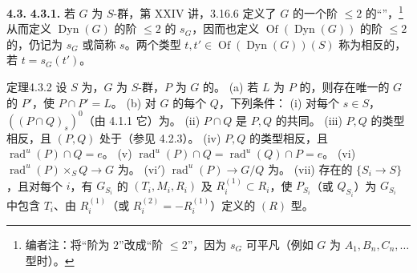 \textbf{4.3. }
\textbf{4.3.1.} 若 $G$ 为 $S$-群，第 XXIV 讲，3.16.6 定义了 $G$ 的一个阶 $\le2$ 的“”，\footnote{编者注：将“阶为 $2$”改成“阶 $\le2$”，因为 $s_G$ 可平凡（例如 $G$ 为 $A_1,B_n,C_n,\ldots$ 型时）。}从而定义 $\operatorname{Dyn}(G)$ 的阶 $\le2$ 的 $s_G$，因而也定义 $\operatorname{Of}(\operatorname{Dyn}(G))$ 的阶 $\le2$ 的，仍记为 $s_G$ 或简称 $s$。两个类型 $t,t'\in\operatorname{Of}(\operatorname{Dyn}(G))(S)$ 称为相反的，若 $t=s_G(t')$。
\begin{SGAresult}{定理}{4.3.2}
设 $S$ 为，$G$ 为 $S$-群，$P$ 为 $G$ 的。
(a) 若 $L$ 为 $P$ 的，则存在唯一的 $G$ 的 $P'$，使 $P\cap P'=L$。
(b) 对 $G$ 的每个 $Q$，下列条件：
(i) 对每个 $s\in S$，$((P\cap Q)_s)^0$（由 4.1.1 它）为。
(ii) $P\cap Q$ 是 $P,Q$ 的共同。
(iii) $P,Q$ 的类型相反，且 $(P,Q)$ 处于（参见 4.2.3）。
(iv) $P,Q$ 的类型相反，且 $\operatorname{rad}^{u}(P)\cap Q=e$。
(v) $\operatorname{rad}^{u}(P)\cap Q=\operatorname{rad}^{u}(Q)\cap P=e$。
(vi)  $\operatorname{rad}^{u}(P)\times_SQ\to G$ 为。
(vi$'$)  $\operatorname{rad}^{u}(P)\to G/Q$ 为。
(vii) 存在的 $\{S_i\to S\}$，且对每个 $i$，有 $G_{S_i}$ 的 $(T_i,M_i,R_i)$ 及 $R_i^{(1)}\subset R_i$，使 $P_{S_i}$（或 $Q_{S_i}$）为 $G_{S_i}$ 中包含 $T_i$、由 $R_i^{(1)}$（或 $R_i^{(2)}=-R_i^{(1)}$）定义的 $(R)$ 型。
\end{SGAresult}

